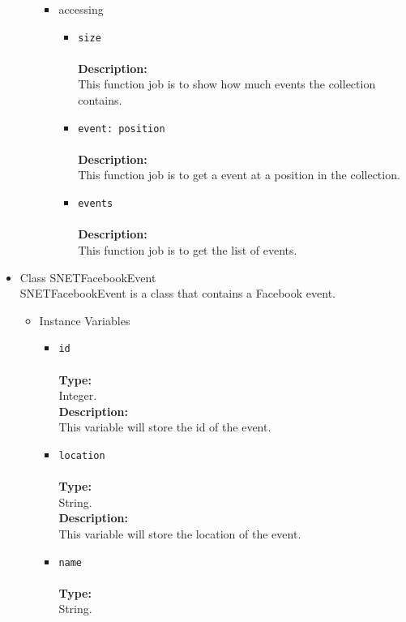 \begin{itemize}
\begin{itemize}
\begin{itemize}
\item accessing
\label{sec-1-4-2-12-2-3}%
\begin{itemize}
\item \verb~size~\\\\
\textbf{Description:}\\
      This function job is to show how much events the collection contains.\\
\item \verb~event: position~\\\\
\textbf{Description:}\\
      This function job is to get a event at a position in the collection.\\
\item \verb~events~\\\\
\textbf{Description:}\\
      This function job is to get the list of events.
\end{itemize}

\end{itemize} %
\end{itemize} %

\item Class SNETFacebookEvent\\
\label{sec-1-4-2-13}%
SNETFacebookEvent is a class that contains a Facebook event.
   
\begin{itemize}

\item Instance Variables
\label{sec-1-4-2-13-1}%
\begin{itemize}
\item \verb~id~\\\\
\textbf{Type:}\\
     Integer.\\

     \textbf{Description:}\\
     This variable will store the id of the event.\\
\item \verb~location~\\\\
\textbf{Type:}\\
     String.\\

     \textbf{Description:}\\
     This variable will store the location of the event.\\
\item \verb~name~\\\\
\textbf{Type:}\\
     String.\\


\end{itemize}
\end{itemize}
\end{itemize}
